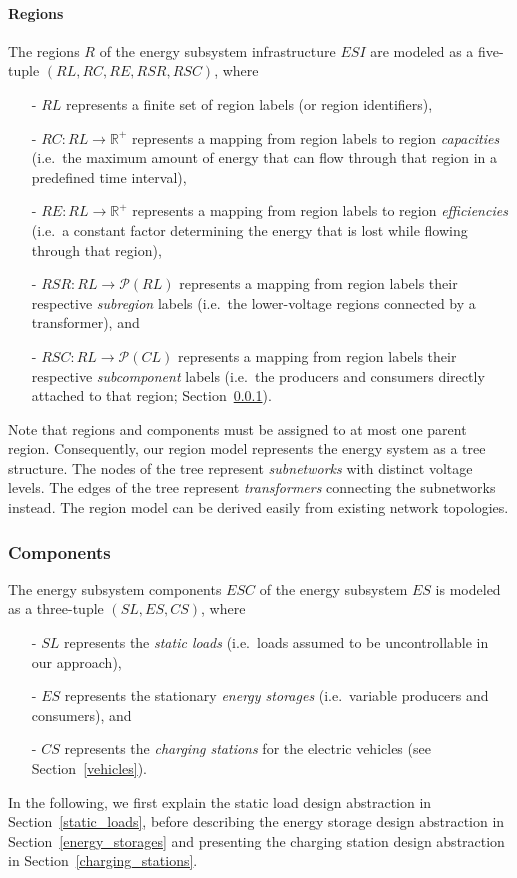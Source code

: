 \paragraph{Regions}
\label{regions}

The regions $R$ of the energy subsystem infrastructure $ESI$ are modeled as a five-tuple $(RL, RC, RE, RSR, RSC)$, where
\begin{itemize}
	\item[-] $RL$ represents a finite set of region labels (or region identifiers),
	\item[-] $RC: RL \rightarrow \mathbb{R}^+$ represents a mapping from region labels to region \textit{capacities} (i.e.\ the maximum amount of energy that can flow through that region in a predefined time interval),
	\item[-] $RE: RL \rightarrow \mathbb{R}^+$ represents a mapping from region labels to region \textit{efficiencies} (i.e.\ a constant factor determining the energy that is lost while flowing through that region),
	\item[-] $RSR: RL \rightarrow \mathcal{P}(RL)$ represents a mapping from region labels their respective \textit{subregion} labels (i.e.\ the lower-voltage regions connected by a transformer), and
	\item[-] $RSC: RL \rightarrow \mathcal{P}(CL)$ represents a mapping from region labels their respective \textit{subcomponent} labels (i.e.\ the producers and consumers directly attached to that region; Section~\ref{components}).
\end{itemize}
Note that regions and components must be assigned to at most one parent region. Consequently, our region model represents the energy system as a tree structure. The nodes of the tree represent \textit{subnetworks} with distinct voltage levels. The edges of the tree represent \textit{transformers} connecting the subnetworks instead. The region model can be derived easily from existing network topologies.


\subsubsection{Components}
\label{components}

The energy subsystem components $ESC$ of the energy subsystem $ES$ is modeled as a three-tuple $(SL, ES, CS)$, where
\begin{itemize}
	\item[-] $SL$ represents the \textit{static loads} (i.e.\ loads assumed to be uncontrollable in our approach),
	\item[-] $ES$ represents the stationary \textit{energy storages} (i.e.\ variable producers and consumers), and
	\item[-] $CS$ represents the \textit{charging stations} for the electric vehicles (see Section~\ref{vehicles}).
\end{itemize}
In the following, we first explain the static load design abstraction in Section~\ref{static_loads}, before describing the energy storage design abstraction in Section~\ref{energy_storages} and presenting the charging station design abstraction in Section~\ref{charging_stations}.

